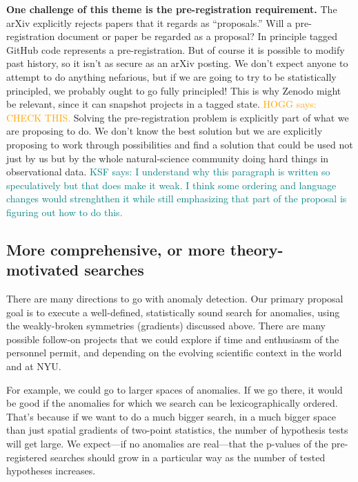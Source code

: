 \documentclass[12pt, fullpage, letterpaper]{article}
\newcommand{\KSF}[1]{\textcolor{teal}{KSF says: #1}}
\newcommand{\HOGG}[1]{\textcolor{orange}{HOGG says: #1}}
\begin{document}
\textbf{One challenge of this theme is the pre-registration requirement.}
The arXiv explicitly rejects papers that it regards as ``proposals.'' Will a
pre-registration document or paper be regarded as a proposal? In principle
tagged GitHub code represents a pre-registration. But of course it is possible
to modify past history, so it isn't as secure as an arXiv posting.
We don't expect anyone to attempt to do anything nefarious, but if we are
going to try to be statistically principled, we probably ought to go fully principled!
This is why Zenodo might be relevant, since it can snapshot projects in a tagged
state. \HOGG{CHECK THIS.}
Solving the pre-registration problem is explicitly part of what we are proposing to do.
We don't know the best solution but we are explicitly proposing to work through possibilities
and find a solution that could be used not just by us but by the whole natural-science
community doing hard things in observational data.
\KSF{I understand why this paragraph is written so speculatively but that does make it weak. I think some ordering and language changes would strenghthen it while still emphasizing that part of the proposal is figuring out how to do this.}

\subsection{More comprehensive, or more theory-motivated searches}

There are many directions to go with anomaly detection.
Our primary proposal goal is to execute a well-defined, statistically sound search for anomalies, using the weakly-broken symmetries (gradients) discussed above.
There are many possible follow-on projects that we could explore if time and enthusiasm of the personnel permit, and depending on the evolving scientific context in the world and at NYU.

For example, we could go to larger spaces of anomalies.
If we go there, it would be good if the anomalies for which we search can be
lexicographically ordered.
That's because if we want to do a much bigger search, in a much bigger space
than just spatial gradients of two-point statistics, the number of hypothesis
tests will get large.
We expect---if no anomalies are real---that the p-values of the pre-registered searches should
grow in a particular way as the number of tested hypotheses increases.
\end{document}
